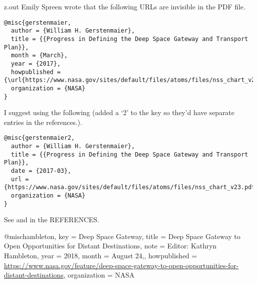 \MyIO


\begin{VerbatimOut}{z.out}
Emily Spreen wrote that the following URLs are invisible in the PDF file.

\begin{verbatim}
@misc{gerstenmaier,
  author = {William H. Gerstenmaier},
  title = {{Progress in Defining the Deep Space Gateway and Transport Plan}},
  month = {March},
  year = {2017},
  howpublished = {\url{https://www.nasa.gov/sites/default/files/atoms/files/nss_chart_v23.pdf}},
  organization = {NASA}
}
\end{verbatim}

I suggest using the following
(added a `2' to the key so they'd have separate entries in the references.).
\begin{verbatim}
@misc{gerstenmaier2,
  author = {William H. Gerstenmaier},
  title = {{Progress in Defining the Deep Space Gateway and Transport Plan}},
  date = {2017-03},
  url = {https://www.nasa.gov/sites/default/files/atoms/files/nss_chart_v23.pdf},
  organization = {NASA}
}
\end{verbatim}

See \cite{gerstenmaier} and \cite{gerstenmaier2} in the REFERENCES.
\end{VerbatimOut}


@misc{hambleton,
  key = {Deep Space Gateway},
  title = {{Deep Space Gateway to Open Opportunities for Distant Destinations}},
  note = {Editor: Kathryn Hambleton},
  year = {2018},
  month = {August 24,},
  howpublished = {\url{https://www.nasa.gov/feature/deep-space-gateway-to-open-opportunities-for-distant-destinations}},
  organization = {NASA}
}
              
\MyIO
